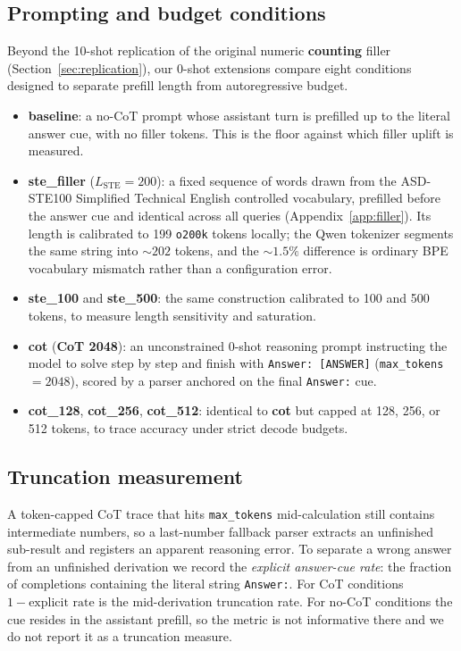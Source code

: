 \documentclass[11pt,a4paper]{article}
\begin{document}
\subsection{Prompting and budget conditions}

Beyond the 10-shot replication of the original numeric \textbf{counting} filler
(Section~\ref{sec:replication}), our 0-shot extensions compare eight conditions
designed to separate prefill length from autoregressive budget.
\begin{itemize}
    \item \textbf{baseline}: a no-CoT prompt whose assistant turn is prefilled up
    to the literal answer cue, with no filler tokens. This is the floor against
    which filler uplift is measured.
    \item \textbf{ste\_filler} ($L_{\mathrm{STE}}{=}200$): a fixed sequence of
    words drawn from the ASD-STE100 Simplified Technical English controlled
    vocabulary, prefilled before the answer cue and identical across all queries
    (Appendix~\ref{app:filler}). Its length is calibrated to 199 \texttt{o200k}
    tokens locally; the Qwen tokenizer segments the same string into ${\sim}202$
    tokens, and the ${\sim}1.5\%$ difference is ordinary BPE vocabulary
    mismatch rather than a configuration error.
    \item \textbf{ste\_100} and \textbf{ste\_500}: the same construction
    calibrated to 100 and 500 tokens, to measure length sensitivity and
    saturation.
    \item \textbf{cot} (\textbf{CoT 2048}): an unconstrained 0-shot reasoning
    prompt instructing the model to solve step by step and finish with
    \texttt{Answer: [ANSWER]} (\texttt{max\_tokens}${=}2048$), scored by a parser
    anchored on the final \texttt{Answer:} cue.
    \item \textbf{cot\_128}, \textbf{cot\_256}, \textbf{cot\_512}: identical to
    \textbf{cot} but capped at 128, 256, or 512 tokens, to trace accuracy under
    strict decode budgets.
\end{itemize}

\subsection{Truncation measurement}
\label{sec:trunc}

A token-capped CoT trace that hits \texttt{max\_tokens} mid-calculation still
contains intermediate numbers, so a last-number fallback parser extracts an
unfinished sub-result and registers an apparent reasoning error. To separate a
wrong answer from an unfinished derivation we record the \emph{explicit answer-cue
rate}: the fraction of completions containing the literal string \texttt{Answer:}.
For CoT conditions $1-\text{explicit rate}$ is the mid-derivation truncation rate.
For no-CoT conditions the cue resides in the assistant prefill, so the metric is
not informative there and we do not report it as a truncation measure.
\end{document}
